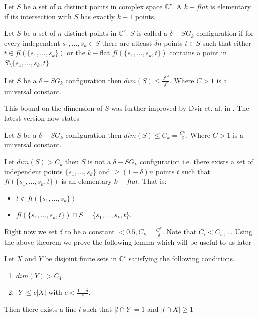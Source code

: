 \documentclass[letterpaper,USenglish,numberwithinsect]{lipics}
\newcommand{\C}{\mathbb{C}}
\begin{document}
\begin{definition}\label{elementaryset}
Let $S$ be a set of $n$ distinct points in complex space $\C ^r$. A $k - flat$
is elementary if its intersection with $S$ has exactly $k+1$ points.
\end{definition}


\begin{definition}
Let $S$ be a set of $n$ distinct points in $\C^r$. $S$ is called a $\delta -
SG_k$ configuration if for every
independent $s_1,\ldots,s_k \in S$ there are atleast $\delta n$ points $t\in S$
such that either $t\in fl(\{s_1,\ldots,s_k\})$ or the $k-$flat
$fl(\{s_1,\ldots,s_k,t\})$ contains a point in $S\setminus
\{s_1,\ldots,s_k,t\}$.
\end{definition}

\begin{theorem}
Let $S$ be a $\delta-SG_k$ configuration then
$dim(S) \leq \frac{2^{C^k}}{\delta^2}$. Where $C>1$ is a universal constant.
\end{theorem}

This bound on the dimension of $S$ was further improved by Dvir et. al. in \cite{DSW12}. The latest version
now states
\begin{theorem}\label{bdwy}
 Let $S$ be a $\delta-SG_k$ configuration then
$dim(S) \leq C_k = \frac{C^k}{\delta}$. Where $C>1$ is a universal constant.
\end{theorem}

\begin{corollary} \label{elementary}
 Let $dim(S)> C_k$ then $S$ is not a $\delta-SG_k$
configuration i.e. there exists a set of independent points $\{s_1,\ldots,s_k\}$
 and $\geq (1-\delta)n$ points $t$ such that $fl(\{s_1,\ldots,s_k,t\})$ is an
elementary $k - flat$. That is:
 \begin{itemize}
  \item $t\notin fl(\{s_1,\ldots,s_k\})$
  \item $fl(\{s_1,\ldots,s_k,t\}) \cap S = \{s_1,\ldots,s_k,t\}$.
 \end{itemize}

\end{corollary}
Right now we set $\delta$ to be a constant $ < 0.5, C_k = \frac{C^k}{\delta}$. Note
that $C_i<C_{i+1}$.
Using the above theorem we prove the following lemma which will be useful to us
later
\begin{lemma}\label{bichromatic}
 Let $X$ and $Y$ be disjoint finite sets in $\C^r$ satisfying the following
conditions.
\begin{enumerate}
\item $dim(Y)>C_4$.
\item $|Y|\leq  c|X|$ with $c < \frac{1-\delta}{\delta}$.
\end{enumerate}
Then there exists a line $l$ such that $|l\cap Y|=1$ and $|l\cap X|\geq 1$
\end{lemma}
\end{document}
